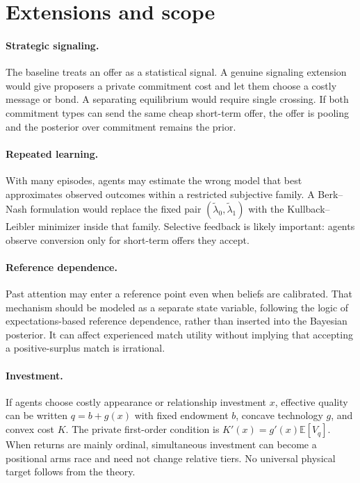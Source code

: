 \documentclass[11pt]{article}
\newcommand{\E}{\mathbb{E}}
\begin{document}
\section{Extensions and scope}\label{sec:extensions}

\paragraph{Strategic signaling.}
The baseline treats an offer as a statistical signal. A genuine signaling
extension would give proposers a private commitment cost and let them choose a
costly message or bond. A separating equilibrium would require single crossing.
If both commitment types can send the same cheap short-term offer, the offer is
pooling and the posterior over commitment remains the prior.

\paragraph{Repeated learning.}
With many episodes, agents may estimate the wrong model that best approximates
observed outcomes within a restricted subjective family. A Berk--Nash
formulation would replace the fixed pair
$(\widetilde\lambda_0,\widetilde\lambda_1)$ with the Kullback--Leibler minimizer
inside that family. Selective feedback is likely important: agents observe
conversion only for short-term offers they accept.

\paragraph{Reference dependence.}
Past attention may enter a reference point even when beliefs are calibrated.
That mechanism should be modeled as a separate state variable, following the
logic of expectations-based reference dependence, rather than inserted into the
Bayesian posterior. It can affect experienced match utility without implying
that accepting a positive-surplus match is irrational.

\paragraph{Investment.}
If agents choose costly appearance or relationship investment $x$, effective
quality can be written $q=b+g(x)$ with fixed endowment $b$, concave technology
$g$, and convex cost $K$. The private first-order condition is
$K'(x)=g'(x)\E[V_q]$. When returns are mainly ordinal, simultaneous investment
can become a positional arms race and need not change relative tiers. No
universal physical target follows from the theory.
\end{document}
